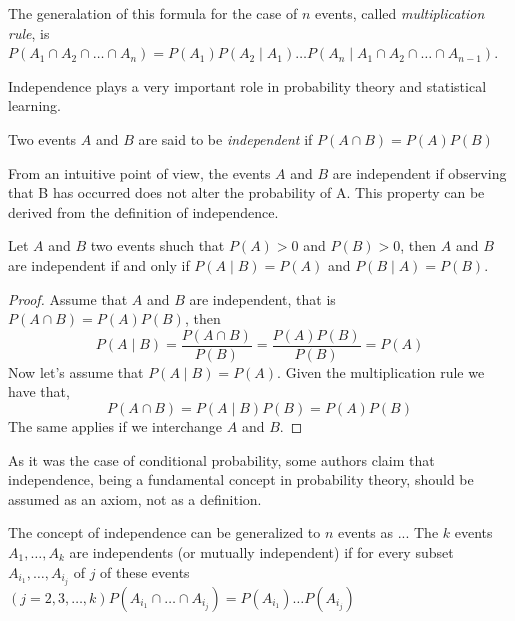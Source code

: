The generalation of this formula for the case of $n$ events, called \emph{multiplication rule}, is $P \left( A_{1} \cap A_{2} \cap \ldots \cap A_{n} \right) = P \left( A_{1} \right) P \left( A_{2} \mid A_{1}\right) \ldots  P \left( A_{n} \mid A_{1}\cap A_{2} \cap \ldots \cap A_{n-1} \right)$.

Independence plays a very important role in probability theory and statistical learning. 

\begin{definition}
Two events $A$ and $B$ are said to be \emph{independent} if $P \left( A \cap B \right) = P \left( A \right) P \left(B \right)$
\end{definition}

From an intuitive point of view, the events $A$ and $B$ are independent if observing that B has occurred does not alter the probability of A. This property can be derived from the definition of independence.

\begin{proposition}
Let $A$ and $B$ two events shuch that $P \left( A \right) > 0$ and $P \left( B \right)>0$, then $A$ and $B$ are independent if and only if $P \left( A \mid B\right) = P \left( A \right)$ and $P \left( B \mid  A \right) = P \left( B \right)$.
\end{proposition}
\begin{proof}
Assume that $A$ and $B$ are independent, that is $P \left( A \cap B \right) = P \left( A \right) P \left(B \right)$, then
\[
P \left( A \mid B \right) = \frac{P\left(A\cap B\right)}{P\left(B\right)} = \frac{P \left( A \right) P \left(B \right)}{P\left(B\right)} = P \left( A \right)
\]
Now let's assume that $P \left( A \mid B \right) = P \left( A \right)$. Given the multiplication rule we have that,
\[
P \left( A \cap B \right) =  P \left( A \mid B \right) P \left( B \right) = P \left( A \right) P \left( B \right)
\] 
The same applies if we interchange $A$ and $B$. 
\end{proof}

As it was the case of conditional probability, some authors claim that independence, being a fundamental concept in probability theory, should be assumed as an axiom, not as a definition.

The concept of independence can be generalized to $n$ events as ... The $k$ events $A_{1},\ldots,A_{k}$ are independents (or mutually independent) if for every subset $A_{i_{1}},\ldots,A_{i_{j}}$ of $j$ of these events $\left(j=2,3,\ldots,k\right)P\left(A_{i_{1}}\cap\ldots\cap A_{i_{j}}\right)=P\left(A_{i_{1}}\right)\ldots P\left(A_{i_{j}}\right)$

